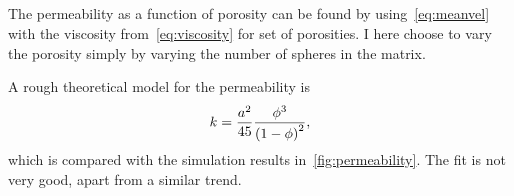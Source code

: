 \documentclass[11pt,british,a4paper]{report}
\begin{document}
\subsection{}
The permeability as a function of porosity can be found by using~\vref{eq:meanvel} with the viscosity from~\vref{eq:viscosity} for set of porosities. I here choose to vary the porosity simply by varying the number of spheres in the matrix.

A rough theoretical model for the permeability is\cite{feder_flow_1984}
\begin{equation}
    k = \frac{a^2}{45}\frac{\phi^3}{\qty(1-\phi)^2},\label{eq:modelpermeability}
\end{equation}
which is compared with the simulation results in~\vref{fig:permeability}. The fit is not very good, apart from a similar trend.
\end{document}
